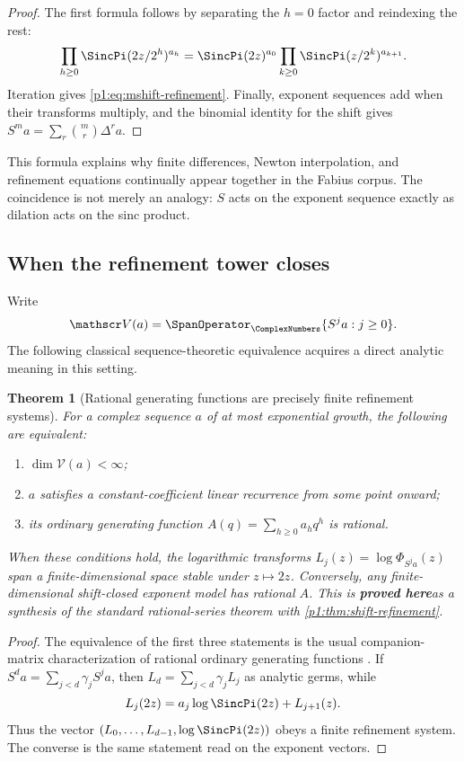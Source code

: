 \documentclass[11pt,oneside]{article}
\numberwithin{equation}{section}
\newtheorem{theorem}{Theorem}[section]
\theoremstyle{definition}
\theoremstyle{remark}
\newcommand{\statusproved}{\textcolor{deepgreen}{\textbf{proved here}}}
\begin{document}
\begin{proof}
The first formula follows by separating the $h=0$ factor and reindexing the rest:
\[
 \prod_{h\ge0}\SincPi(2z/2^h)^{a_h}
 =\SincPi(2z)^{a_0}
  \prod_{k\ge0}\SincPi(z/2^k)^{a_{k+1}}.
\]
Iteration gives \eqref{p1:eq:mshift-refinement}.  Finally, exponent sequences add when their
transforms multiply, and the binomial identity for the shift gives
$S^ma=\sum_r\binom mr\Delta^ra$.
\end{proof}

\begin{remark}
This formula explains why finite differences, Newton interpolation, and refinement equations
continually appear together in the Fabius corpus.  The coincidence is not merely an analogy:
$S$ acts on the exponent sequence exactly as dilation acts on the sinc product.
\end{remark}

\subsection{When the refinement tower closes}

Write
\[
 \mathscr V(a)=\SpanOperator_{\ComplexNumbers}\{S^ja:j\ge0\}.
\]
The following classical sequence-theoretic equivalence acquires a direct analytic meaning in
this setting.

\begin{theorem}[Rational generating functions are precisely finite refinement systems]
\label{p1:thm:rational-classification}
For a complex sequence $a$ of at most exponential growth, the following are equivalent:
\begin{enumerate}
\item $\dim\mathscr V(a)<\infty$;
\item $a$ satisfies a constant-coefficient linear recurrence from some point onward;
\item its ordinary generating function $A(q)=\sum_{h\ge0}a_hq^h$ is rational.
\end{enumerate}
When these conditions hold, the logarithmic transforms
$L_j(z)=\log\Phi_{S^ja}(z)$ span a finite-dimensional space stable under $z\mapsto2z$.
Conversely, any finite-dimensional shift-closed exponent model has rational $A$.
This is \statusproved as a synthesis of the standard rational-series theorem with
\cref{p1:thm:shift-refinement}.
\end{theorem}

\begin{proof}
The equivalence of the first three statements is the usual companion-matrix characterization
of rational ordinary generating functions \cite{p1:stanley1997}.  If
$S^da=\sum_{j<d}\gamma_jS^ja$, then
$L_d=\sum_{j<d}\gamma_jL_j$ as analytic germs, while
\[
 L_j(2z)=a_j\log\SincPi(2z)+L_{j+1}(z).
\]
Thus the vector $(L_0,\ldots,L_{d-1},\log\SincPi(2z))$ obeys a finite refinement system.
The converse is the same statement read on the exponent vectors.
\end{proof}
\end{document}
